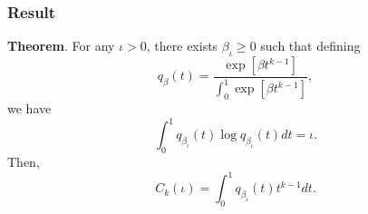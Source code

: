 \documentclass{beamer}
\begin{document}
\begin{frame}
\frametitle{Result}
\textbf{Theorem}.
For any $\iota > 0$, there exists $\beta_\iota \geq 0$ such that defining
\[
q_\beta(t) = \frac{\exp[\beta t^{k-1}]}{\int_0^1 \exp[\beta t^{k-1}]},
\]
we have
\[
\int_0^1 q_{\beta_\iota}(t) \log q_{\beta_\iota}(t) dt = \iota.
\]
Then,
\[
C_k(\iota) = \int_0^1 q_{\beta_\iota}(t) t^{k-1} dt.
\]
\end{frame}
\end{document}

